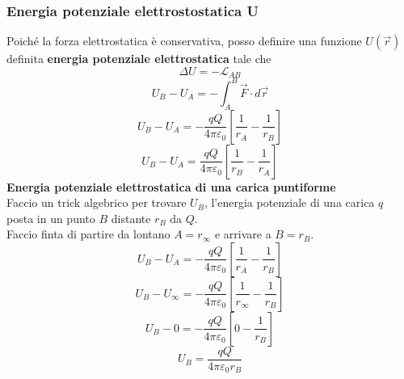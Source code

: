 \documentclass[twoside]{article}
\begin{document}
\subsubsection{Energia potenziale elettrostostatica U}
Poiché la forza elettrostatica è conservativa, posso definire una funzione \(U(\vec{r})\) definita \textbf{energia potenziale elettrostatica} tale che
\begin{equation}
    \boxed{\Delta U = -\mathcal{L}_{AB}}
\end{equation}
\begin{equation*}
    U_B - U_A = - \displaystyle \int_{A}^{B} \vec{F} \cdot d\vec{r}
\end{equation*}
\begin{equation*}
    U_B - U_A = -\frac{qQ}{4\pi \varepsilon_0} \displaystyle\left[ \frac{1}{r_{A}} - \frac{1}{r_{B}}\right]
\end{equation*}
\begin{equation*}
    U_B - U_A = \frac{qQ}{4\pi \varepsilon_0} \displaystyle\left[ \frac{1}{r_{B}} - \frac{1}{r_{A}}\right]
\end{equation*}
\textbf{Energia potenziale elettrostatica di una carica puntiforme}\\
\noindent
Faccio un trick algebrico per trovare \(U_B\), l'energia potenziale di una carica \(q\) posta in un punto \(B\) distante \(r_B\) da \(Q\).\\
Faccio finta di partire da lontano \(A = r_{\infty}\) e arrivare a \(B = r_{B}\).
\begin{equation*}
    U_B - U_A = -\frac{qQ}{4\pi \varepsilon_0} \displaystyle\left[ \frac{1}{r_{A}} - \frac{1}{r_{B}}\right]
\end{equation*}
\begin{equation*}
    U_B - U_{\infty} = -\frac{qQ}{4\pi \varepsilon_0} \displaystyle\left[ \frac{1}{r_{\infty}} - \frac{1}{r_{B}}\right]
\end{equation*}
\begin{equation*}
    U_B - 0 = -\frac{qQ}{4\pi \varepsilon_0} \displaystyle\left[ 0 - \frac{1}{r_{B}}\right]
\end{equation*}
\begin{equation*}
    \boxed{U_B = \frac{qQ}{4\pi \varepsilon_0 r_{B}}}
\end{equation*}
\end{document}
